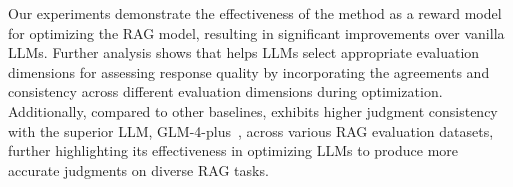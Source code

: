 Our experiments demonstrate the effectiveness of the \method{} method as a reward model for optimizing the RAG model, resulting in significant improvements over vanilla LLMs. Further analysis shows that \method{} helps LLMs select appropriate evaluation dimensions for assessing response quality by incorporating the agreements and consistency across different evaluation dimensions during optimization. Additionally, compared to other baselines, \method{} exhibits higher judgment consistency with the superior LLM, GLM-4-plus~\cite{du2022glm}, across various RAG evaluation datasets, further highlighting its effectiveness in optimizing LLMs to produce more accurate judgments on diverse RAG tasks.













